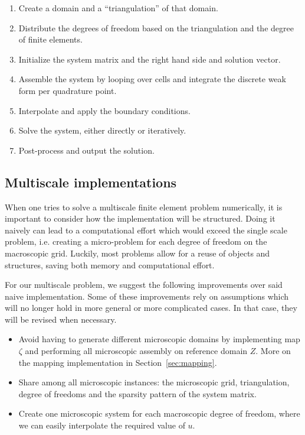 \documentclass{article}
\begin{document}
\begin{enumerate}
    \item Create a domain and a ``triangulation'' of that domain.
    \item Distribute the degrees of freedom based on the triangulation and the degree of finite elements.
    \item Initialize the system matrix and the right hand side and solution vector.
    \item Assemble the system by looping over cells and integrate the discrete weak form per quadrature point.
    \item Interpolate and apply the boundary conditions.
    \item Solve the system, either directly or iteratively.
    \item Post-process and output the solution.
\end{enumerate}

\subsection{Multiscale implementations}
When one tries to solve a multiscale finite element problem numerically, it is important to consider how the implementation will be structured.
Doing it naively can lead to a computational effort which would exceed the single scale problem, i.e. creating a micro-problem for each degree of freedom on the macroscopic grid.
Luckily, most problems allow for a reuse of objects and structures, saving both memory and computational effort.

For our multiscale problem, we suggest the following improvements over said naive implementation. Some of these improvements rely on assumptions which will no longer hold in more general or more complicated cases. In that case, they will be revised when necessary.
\begin{itemize}
    \item Avoid having to generate different microscopic domains by implementing map $\zeta$ and performing all microscopic assembly on reference domain $Z$. More on the mapping implementation in Section~\ref{sec:mapping}.
    \item Share among all microscopic instances: the microscopic grid, triangulation, degree of freedoms and the sparsity pattern of the system matrix.
    \item Create one microscopic system for each macroscopic degree of freedom, where we can easily interpolate the required value of $u$.
\end{itemize}
\end{document}
